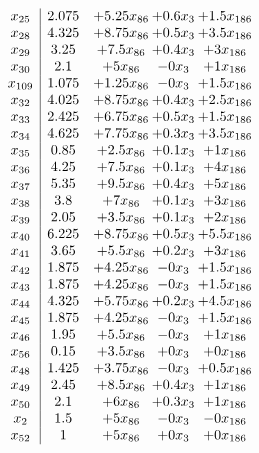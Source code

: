 \documentclass[11pt]{article}
\begin{document}
\[\begin{array}{c| c c@{\hskip 2pt} c@{\hskip 2pt} c@{\hskip 2pt} }
 x_{25}   &  2.075 & + 5.25 x_{86} & + 0.6 x_{3} & + 1.5 x_{186}\\
 x_{28}   &  4.325 & + 8.75 x_{86} & + 0.5 x_{3} & + 3.5 x_{186}\\
 x_{29}   &  3.25 & + 7.5 x_{86} & + 0.4 x_{3} & + 3 x_{186}\\
 x_{30}   &  2.1 & + 5 x_{86} & -0 x_{3} & + 1 x_{186}\\
 x_{109}   &  1.075 & + 1.25 x_{86} & -0 x_{3} & + 1.5 x_{186}\\
 x_{32}   &  4.025 & + 8.75 x_{86} & + 0.4 x_{3} & + 2.5 x_{186}\\
 x_{33}   &  2.425 & + 6.75 x_{86} & + 0.5 x_{3} & + 1.5 x_{186}\\
 x_{34}   &  4.625 & + 7.75 x_{86} & + 0.3 x_{3} & + 3.5 x_{186}\\
 x_{35}   &  0.85 & + 2.5 x_{86} & + 0.1 x_{3} & + 1 x_{186}\\
 x_{36}   &  4.25 & + 7.5 x_{86} & + 0.1 x_{3} & + 4 x_{186}\\
 x_{37}   &  5.35 & + 9.5 x_{86} & + 0.4 x_{3} & + 5 x_{186}\\
 x_{38}   &  3.8 & + 7 x_{86} & + 0.1 x_{3} & + 3 x_{186}\\
 x_{39}   &  2.05 & + 3.5 x_{86} & + 0.1 x_{3} & + 2 x_{186}\\
 x_{40}   &  6.225 & + 8.75 x_{86} & + 0.5 x_{3} & + 5.5 x_{186}\\
 x_{41}   &  3.65 & + 5.5 x_{86} & + 0.2 x_{3} & + 3 x_{186}\\
 x_{42}   &  1.875 & + 4.25 x_{86} & -0 x_{3} & + 1.5 x_{186}\\
 x_{43}   &  1.875 & + 4.25 x_{86} & -0 x_{3} & + 1.5 x_{186}\\
 x_{44}   &  4.325 & + 5.75 x_{86} & + 0.2 x_{3} & + 4.5 x_{186}\\
 x_{45}   &  1.875 & + 4.25 x_{86} & -0 x_{3} & + 1.5 x_{186}\\
 x_{46}   &  1.95 & + 5.5 x_{86} & -0 x_{3} & + 1 x_{186}\\
 x_{56}   &  0.15 & + 3.5 x_{86} & + 0 x_{3} & + 0 x_{186}\\
 x_{48}   &  1.425 & + 3.75 x_{86} & -0 x_{3} & + 0.5 x_{186}\\
 x_{49}   &  2.45 & + 8.5 x_{86} & + 0.4 x_{3} & + 1 x_{186}\\
 x_{50}   &  2.1 & + 6 x_{86} & + 0.3 x_{3} & + 1 x_{186}\\
 x_{2}   &  1.5 & + 5 x_{86} & -0 x_{3} & -0 x_{186}\\
 x_{52}   &  1 & + 5 x_{86} & + 0 x_{3} & + 0 x_{186}\\

\end{array}\]
\end{document}
